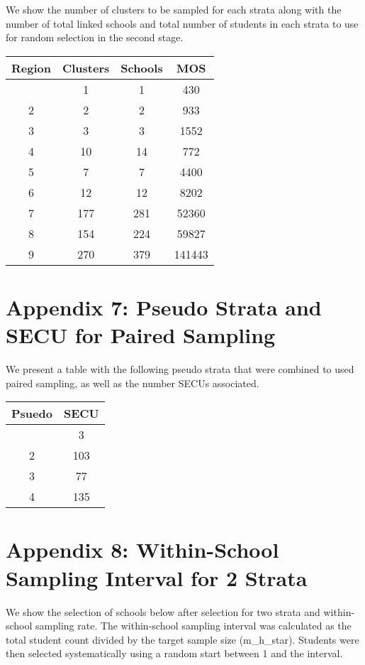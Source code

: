 \documentclass[
  12pt]{article}
\begin{document}
We show the number of clusters to be sampled for each strata along with
the number of total linked schools and total number of students in each
strata to use for random selection in the second stage.

\begin{longtable}[]{@{}cccc@{}}
\toprule\noalign{}
Region & Clusters & Schools & MOS \\
\midrule\noalign{}
\endhead
\bottomrule\noalign{}
\endlastfoot
1 & 1 & 1 & 430 \\
2 & 2 & 2 & 933 \\
3 & 3 & 3 & 1552 \\
4 & 10 & 14 & 772 \\
5 & 7 & 7 & 4400 \\
6 & 12 & 12 & 8202 \\
7 & 177 & 281 & 52360 \\
8 & 154 & 224 & 59827 \\
9 & 270 & 379 & 141443 \\
\end{longtable}

\newpage

\section{Appendix 7: Pseudo Strata and SECU for Paired
Sampling}\label{appendix-7-pseudo-strata-and-secu-for-paired-sampling}

We present a table with the following pseudo strata that were combined
to used paired sampling, as well as the number SECUs associated.

\begin{longtable}[]{@{}cc@{}}
\toprule\noalign{}
Psuedo & SECU \\
\midrule\noalign{}
\endhead
\bottomrule\noalign{}
\endlastfoot
1 & 3 \\
2 & 103 \\
3 & 77 \\
4 & 135 \\
\end{longtable}

\newpage

\section{Appendix 8: Within-School Sampling Interval for 2
Strata}\label{appendix-8-within-school-sampling-interval-for-2-strata}

We show the selection of schools below after selection for two strata
and within-school sampling rate. The within-school sampling interval was
calculated as the total student count divided by the target sample size
(m\_h\_star). Students were then selected systematically using a random
start between 1 and the interval.
\end{document}
